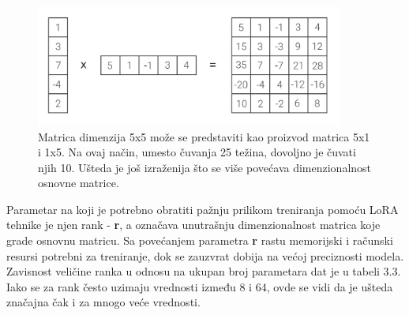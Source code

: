 \documentclass[12pt,oneside]{memoir}
\begin{document}
\begin{figure}[!ht]
	\centering
	\label{fig:LoRAMatrixExample}
	\includegraphics[width=0.9\textwidth]{Lora_Matrix_Example.png}
	\caption{Matrica dimenzija 5x5 može se predstaviti kao proizvod matrica 5x1 i 1x5. Na ovaj način, umesto čuvanja 25 težina, dovoljno je čuvati njih 10. Ušteda je još izraženija što se više povećava dimenzionalnost osnovne matrice.}
\end{figure}

Parametar na koji je potrebno obratiti pažnju prilikom treniranja pomoću LoRA tehnike je njen rank - \textbf{r}, a označava unutrašnju dimenzionalnost matrica koje grade osnovnu matricu. Sa povećanjem parametra \textbf{r} rastu memorijski i računski resursi potrebni za treniranje, dok se zauzvrat dobija na većoj preciznosti modela. Zavisnost veličine ranka u odnosu na ukupan broj parametara dat je u tabeli 3.3. Iako se za rank često uzimaju vrednosti između 8 i 64, ovde se vidi da je ušteda značajna čak i za mnogo veće vrednosti.
\end{document}
